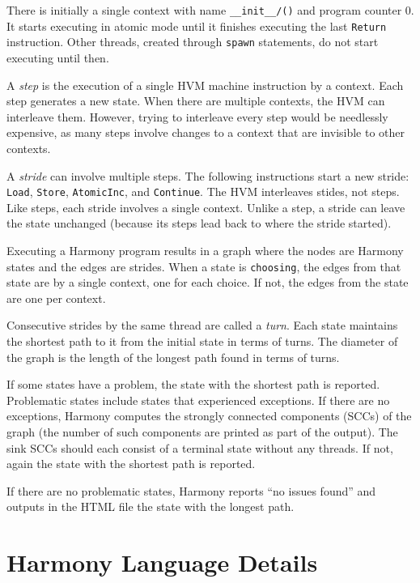 \documentclass{report}
\begin{document}
There is initially a single context with name
\texttt{\_\_init\_\_/()} and program counter 0.  It starts executing
in atomic mode until it finishes executing the last
\texttt{Return} instruction.
Other threads, created through \texttt{spawn} statements, do not
start executing until then.

A \emph{step} is the execution of a single HVM machine instruction
by a context.
Each step generates a new state.
When there are multiple contexts, the HVM can interleave them.
However, trying to interleave every step would be needlessly expensive,
as many steps involve changes to a context that are invisible to
other contexts.

A \emph{stride}
%
can involve multiple steps.  The following
instructions start a new stride: \texttt{Load}, \texttt{Store},
\texttt{AtomicInc}, and \texttt{Continue}.  The HVM
interleaves stides, not steps.  Like steps, each
stride involves a single context.  Unlike a step, a stride
can leave the state unchanged (because its steps lead back
to where the stride started).

Executing a Harmony program results in a graph where the nodes are Harmony
states and the edges are strides.
When a state is \texttt{choosing}, the edges from that state are
by a single context, one for each choice.  If not, the edges from
the state are one per context.

Consecutive strides by the same thread are called a \emph{turn}.
Each state maintains the shortest path to it from the initial state in terms
of turns.
The diameter of the graph is the length of the longest path found in
terms of turns.

If some states have a problem, the state with the shortest path is reported.
Problematic states include states that experienced exceptions.
If there are no exceptions, Harmony computes the strongly connected components (SCCs)
of the graph (the number of such components are printed as part of the output).
The sink SCCs should each consist of a terminal state without any threads.
If not, again the state with the shortest path is reported.

If there are no problematic states, Harmony reports ``no issues found'' and outputs
in the HTML file the state with the longest path.

\chapter{Harmony Language Details}
\label{ap:details}
\end{document}
